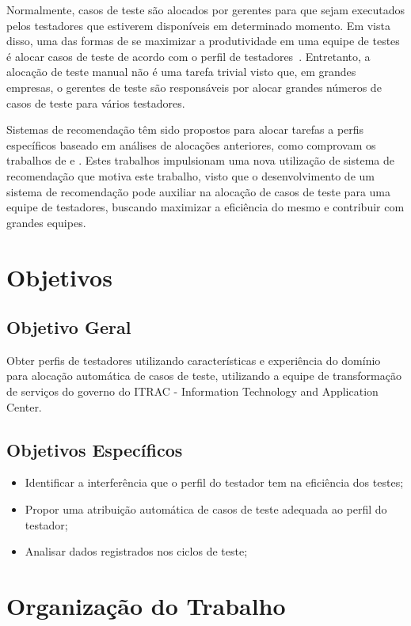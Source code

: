 Normalmente, casos de teste são alocados por gerentes para que sejam executados pelos testadores que estiverem disponíveis em 
determinado momento. Em vista disso, uma das formas de se maximizar a produtividade em uma equipe de testes é alocar casos de teste de acordo com o 
perfil de testadores~\cite{miranda2012recommender}. Entretanto, a alocação de teste manual não é uma tarefa trivial visto que,
em grandes empresas, o gerentes de teste são responsáveis por alocar grandes números de casos de teste para vários testadores.

Sistemas de recomendação têm sido propostos para alocar tarefas a perfis específicos baseado em análises de alocações anteriores, 
como comprovam os trabalhos de \cite{anvik2006should} e \cite{miranda2012recommender}. Estes trabalhos impulsionam uma nova utilização de sistema de recomendação 
que motiva este trabalho, visto que o desenvolvimento de um sistema de recomendação pode auxiliar na alocação de casos de teste
para uma equipe de testadores, buscando maximizar a eficiência do mesmo e contribuir com grandes equipes.


\section{Objetivos}
\subsection{Objetivo Geral}

Obter perfis de testadores utilizando características e experiência do domínio para alocação automática de casos de teste,
utilizando a equipe de transformação de serviços do governo do ITRAC - Information Technology and Application Center.

\subsection{Objetivos Específicos}

\begin{itemize}
		\item Identificar a interferência que o perfil do testador tem na eficiência dos testes;
		\item Propor uma atribuição automática de casos de teste adequada ao perfil do testador; 
		\item Analisar dados registrados nos ciclos de teste;
	\end{itemize}

\section{Organização do Trabalho}

